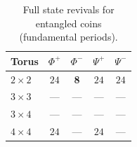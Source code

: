 \begin{table}[H]
\centering
\caption{Full state revivals for entangled coins (fundamental
periods).}
\label{tab:revivals}
\begin{tabular}{lcccc}
\toprule
\textbf{Torus} & $\Phi^+$ & $\Phi^-$ & $\Psi^+$ & $\Psi^-$ \\
\midrule
$2 \times 2$ & $24$ & \textbf{8} & $24$ & $24$ \\
$3 \times 3$ & --- & --- & --- & --- \\
$3 \times 4$ & --- & --- & --- & --- \\
$4 \times 4$ & $24$ & --- & $24$ & --- \\
\bottomrule
\end{tabular}
\end{table}
